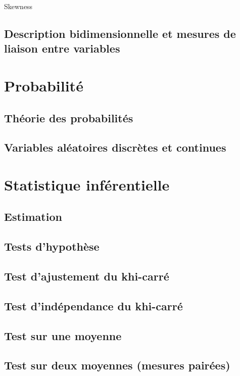 \documentclass{report}
\begin{document}
Skewness

\section{Description bidimensionnelle et mesures de liaison entre variables}

\chapter{Probabilité}

\section{Théorie des probabilités}

\section{Variables aléatoires discrètes et continues}

\chapter{Statistique inférentielle}

\section{Estimation}

\section{Tests d’hypothèse}

\section{Test d’ajustement du khi-carré}

\section{Test d’indépendance du khi-carré}

\section{Test sur une moyenne}

\section{Test sur deux moyennes (mesures pairées)}
\end{document}
